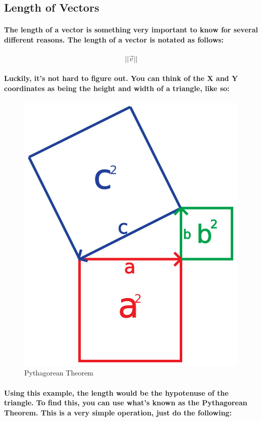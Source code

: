 \subsection{Length of Vectors}
\paragraph{
    The length of a vector is something very important to know for several different reasons. The length of a vector is notated as follows:
}

\paragraph{
    \begin{equation*}
    ||\vec{v} ||
    \end{equation*}
}

\paragraph{
    Luckily, it's not hard to figure out. You can think of the X and Y coordinates as being the height and width of a triangle, like so:
}

\begin{frame}{}
    \begin{figure}[ht]
      \centering
      \includegraphics[width=0.5\linewidth]{images/chap2/PythagoreanTheorem.png}
      \caption{Pythagorean Theorem}
      \label{fig:pythagorean_theorem}
    \end{figure}
\end{frame}

\paragraph{
    Using this example, the length would be the hypotenuse of the triangle. To find this, you can use what's known as the Pythagorean Theorem. This is a very simple operation, just do the following:
}


